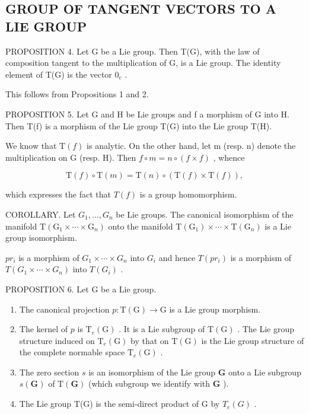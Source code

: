 \subsection{GROUP OF TANGENT VECTORS TO A LIE GROUP}

PROPOSITION 4. Let G be a Lie group. Then T(G), with the law of composition tangent to the multiplication of G, is a Lie group. The identity element of T(G) is the vector \(0_{e}\) .

This follows from Propositions 1 and 2.

PROPOSITION 5. Let G and H be Lie groups and f a morphism of G into H. Then T(f) is a morphism of the Lie group T(G) into the Lie group T(H).

We know that \(\mathrm{T}(f)\) is analytic. On the other hand, let m (resp. n) denote the multiplication on G (resp. H). Then \(f \circ m = n \circ (f \times f)\) , whence

\[
\mathrm{T} (f) \circ \mathrm{T} (m) = \mathrm{T} (n) \circ (\mathrm{T} (f) \times \mathrm{T} (f)),
\]

which expresses the fact that \(T(f)\) is a group homomorphism.

COROLLARY. Let \(G_{1},\ldots,G_{n}\) be Lie groups. The canonical isomorphism of the manifold \(\mathrm{T}(\mathrm{G}_{1}\times\cdots\times\mathrm{G}_{n})\) onto the manifold \(\mathrm{T}(\mathrm{G}_{1})\times\cdots\times\mathrm{T}(\mathrm{G}_{n})\) is a Lie group isomorphism.

\(pr_{i}\) is a morphism of \(G_{1} \times \cdots \times G_{n}\) into \(G_{i}\) and hence \(T(pr_{i})\) is a morphism of \(T(G_{1} \times \cdots \times G_{n})\) into \(T(G_{i})\) .

PROPOSITION 6. Let G be a Lie group.

\begin{enumerate}
\def\labelenumi{(\roman{enumi})}
\item
  The canonical projection \(p: \mathrm{T}(\mathrm{G}) \to \mathrm{G}\) is a Lie group morphism.
\item
  The kernel of \(p\) is \(\mathrm{T}_e(\mathrm{G})\) . It is a Lie subgroup of \(\mathrm{T}(\mathrm{G})\) . The Lie group structure induced on \(\mathrm{T}_e(\mathrm{G})\) by that on \(\mathrm{T}(\mathrm{G})\) is the Lie group structure of the complete normable space \(\mathrm{T}_e(\mathrm{G})\) .
\item
  The zero section \(s\) is an isomorphism of the Lie group \(\mathbf{G}\) onto a Lie subgroup \(s(\mathbf{G})\) of \(\mathrm{T}(\mathbf{G})\) (which subgroup we identify with \(\mathbf{G}\) ).
\item
  The Lie group T(G) is the semi-direct product of G by \(T_{e}(G)\) .
\end{enumerate}

